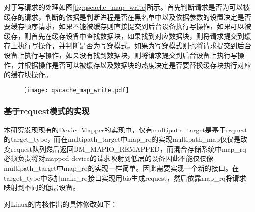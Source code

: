 对于写请求的处理如图\ref{fig:qscache_map_write}所示。首先判断请求是否为可以被缓存的请求，判断的依据是判断进程是否在黑名单中以及依据参数的设置决定是否要缓存顺序请求，如果不能被缓存则直接提交到后台设备执行写操作，如果可以被缓存，则首先在缓存设备中查找数据块，如果找到对应数据块，则将请求提交到缓存上执行写操作，并判断是否为写穿模式，如果为写穿模式则也将请求提交到后台设备上执行写操作，如果没有找到数据块，则将请求提交到后台设备上执行写操作，并根据操作是否可以被缓存以及数据块的热度决定是否要替换缓存块执行对应的缓存块操作。

\begin{figure}[H]
    \centering
    \texttt{[image: qscache\_map\_write.pdf]}
\end{figure}

\subsubsection{基于request模式的实现}

本研究发现现有的Device Mapper的实现中，仅有multipath\_target是基于request的target\_type，而在multipath\_target中map\_rq的实现multipath\_map仅仅是改变request队列然后返回DM\_MAPIO\_REMAPPED，而混合存储系统中map\_rq必须负责将对mapped device的请求映射到低层的设备因此不能仅仅像multipath\_target中map\_rq的实现一样简单。因此需要实现一个新的接口。在target\_type中添加make\_rq接口实现用bio生成request，然后依靠map\_rq将请求映射到不同的低层设备。

对Linux的内核作出的具体修改如下：


